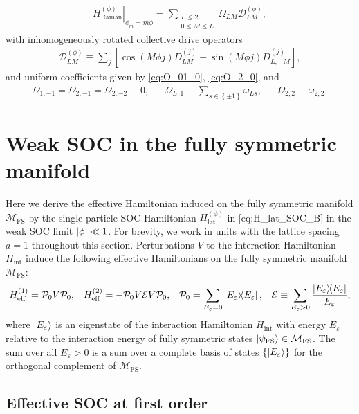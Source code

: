 \documentclass[nofootinbib,notitlepage,11pt]{revtex4-2}
\renewcommand{\t}{\text} %
\newcommand{\f}[2]{\dfrac{#1}{#2}} %
\newcommand{\p}[1]{\left(#1\right)} %
\renewcommand{\sp}[1]{\left[#1\right]} %
\renewcommand{\set}[1]{\left\{#1\right\}} %
\newcommand{\1}{\mathds{1}}
\newcommand{\D}{\mathcal{D}}
\newcommand{\E}{\mathcal{E}}
\newcommand{\M}{\mathcal{M}}
\renewcommand{\P}{\mathcal{P}}
\newcommand{\FS}{\text{FS}}
\begin{document}
\begin{align}
  \left. H_{\t{Raman}}^{(\phi)} \right|_{\phi_m=m\phi}
  = \sum_{\substack{L\le2\\0\le M\le L}} \Omega_{LM} \D_{LM}^{(\phi)},
\end{align}
with inhomogeneously rotated collective drive operators
\begin{align}
  \D_{LM}^{(\phi)}
  \equiv \sum_j \sp{\cos\p{M\phi j} D_{LM}^{(j)}
    - \sin\p{M\phi j} D_{L,-M}^{(j)}},
\end{align}
and uniform coefficients given by \eqref{eq:O_01_0}, \eqref{eq:O_2_0},
and
\begin{align}
  \Omega_{1,-1} = \Omega_{2,-1} = \Omega_{2,-2} \equiv 0,
  &&
  \Omega_{L,1} \equiv \sum_{s\in\set{\pm1}} \omega_{Ls},
  &&
  \Omega_{2,2} \equiv \omega_{2,2}.
\end{align}

\section{Weak SOC in the fully symmetric manifold}

Here we derive the effective Hamiltonian induced on the fully
symmetric manifold $\M_\FS$ by the single-particle SOC Hamiltonian
$H_{\t{lat}}^{(\phi)}$ in \eqref{eq:H_lat_SOC_B} in the weak SOC limit
$\abs{\phi}\ll1$.  For brevity, we work in units with the lattice
spacing $a=1$ throughout this section.  Perturbations $V$ to the
interaction Hamiltonian $H_{\t{int}}$ induce the following effective
Hamiltonians on the fully symmetric manifold
$\M_\FS$\cite{bravyi2011schrieffer, perlin2019effective}:
\begin{align}
  H_{\t{eff}}^{(1)} = \P_0 V \P_0,
  &&
  H_{\t{eff}}^{(2)} = -\P_0 V \E V \P_0,
  &&
  \P_0 = \sum_{E_{\varepsilon}=0} \op{E_{\varepsilon}},
  &&
  \E \equiv \sum_{E_\varepsilon>0} \f{\op{E_\varepsilon}}{E_\varepsilon},
  \label{eq:pert}
\end{align}
where $\ket{E_\varepsilon}$ is an eigenstate of the interaction
Hamiltonian $H_{\t{int}}$ with energy $E_\varepsilon$ relative to the
interaction energy of fully symmetric states
$\ket{\psi_\FS}\in\M_\FS$.  The sum over all $E_\varepsilon>0$ is a
sum over a complete basis of states $\set{\ket{E_\varepsilon}}$ for
the orthogonal complement of $\M_\FS$.

\subsection{Effective SOC at first order}
\label{sec:H_eff_1}
\end{document}
